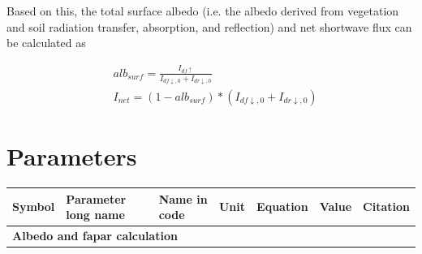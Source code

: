 Based on this, the total surface albedo (i.e. the albedo derived from vegetation and soil radiation transfer, absorption, and reflection)  and net shortwave flux can be calculated as 

\begin{subequations}\label{eq:rad:canopy_absorbed_radiation_components2}
\begin{align}
&alb_{surf} =  \frac{I_{df \uparrow}}{I_{df\downarrow,0}+I_{dr \downarrow, 0}} \\
&I_{net} = (1-alb_{surf}) * (I_{df\downarrow,0}+I_{dr \downarrow, 0})
\end{align} 
\end{subequations} 

\begin{table}
\section{Parameters}\label{tab:rad:param}


\begin{tabularx}{\linewidth}{|c|X|l|l|c|l|c|} %
\hline 
Symbol & Parameter long name & Name in code & Unit & Equation & Value & Citation \\ 
\hline 

\multicolumn{6}{l}{\bf Albedo and fapar calculation}\\
\hline


\end{tabularx}
\end{table}
